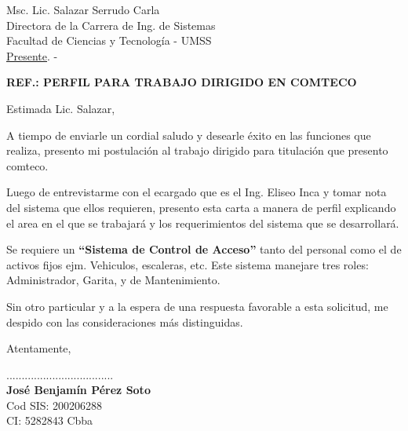 \documentclass[letterpaper,12pt]{letter}
\begin{document}
\date {23 de marzo de 2012}
\begin{letter}{Msc. Lic. Salazar Serrudo Carla \\ Directora de la Carrera de Ing. de Sistemas \\ Facultad de Ciencias y Tecnolog\'ia - UMSS \\ \underline {Presente}. -}
\begin{center}
	\opening{\textbf{REF.: PERFIL PARA TRABAJO DIRIGIDO EN COMTECO}}
\end{center}

Estimada Lic. Salazar,

A tiempo de enviarle un cordial saludo y desearle éxito en las funciones que realiza, presento mi
postulaci\'on al trabajo dirigido para titulaci\'on que presento comteco.

Luego de entrevistarme con el ecargado que es el Ing. Eliseo Inca y tomar nota del sistema que ellos
requieren, presento esta carta a manera de perfil explicando el area en el que se trabajar\'a y los 
requerimientos del sistema que se desarrollar\'a.

Se requiere un {\bfseries ``Sistema de Control de Acceso''} tanto del personal como el de activos 
fijos ejm. Vehiculos, escaleras, etc. Este sistema manejare tres roles: Administrador, Garita, y de
Mantenimiento.

Sin otro particular y a la espera de una respuesta favorable a esta solicitud, me despido con las consideraciones más distinguidas.

Atentamente,

\vspace{3cm}

\begin{center}
...................................\\
{\bfseries Jos\'e Benjam\'in P\'erez Soto}\\
Cod SIS: 200206288\\
CI: 5282843 Cbba\\
\end{center}
\end{letter}
\end{document}
